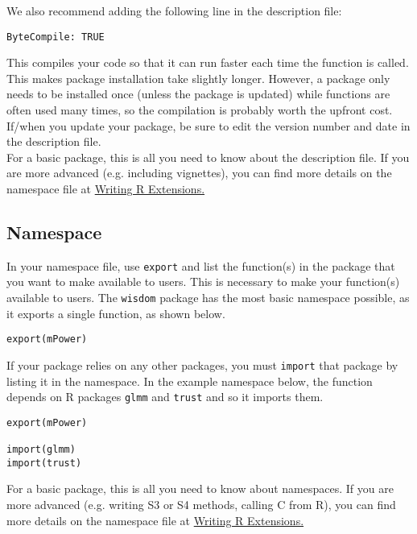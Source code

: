 \documentclass{article}
\begin{document}
We also recommend adding the following line in the description file:
\begin{verbatim}
ByteCompile: TRUE
\end{verbatim}
This compiles your code so that it can run faster each time the function is called. This makes package installation take slightly longer. However, a package only needs to be installed once (unless the package is updated) while functions are often used many times, so the compilation is probably worth the upfront cost.\\

If/when you update your package, be sure to edit the version number and date in the description file. \\ 

For a basic package, this is all you need to know about the description file. If you are more advanced (e.g. including vignettes), you can find more details on the namespace file at  \href{https://cran.r-project.org/doc/manuals/R-exts.html#The-DESCRIPTION-file}{Writing R Extensions.}


\subsection{Namespace} In your namespace file, use  \texttt{export} and list the function(s) in the package that you want to make available to users. This is necessary to make your function(s) available to users. The  \texttt{wisdom} package has the most basic namespace possible, as it exports a single function, as shown below.

\begin{verbatim}
export(mPower)
\end{verbatim}

If your package relies on any other packages, you must \texttt{import} that package by listing it in the namespace. In the example namespace below, the function depends on R packages \texttt{glmm} and \texttt{trust} and so it imports them.

\begin{verbatim}
export(mPower)

import(glmm)
import(trust)
\end{verbatim}

For a basic package, this is all you need to know about namespaces. If you are more advanced (e.g. writing S3 or S4 methods, calling C from R), you can find more details on the namespace file at  \href{https://cran.r-project.org/doc/manuals/R-exts.html#Package-namespaces}{Writing R Extensions.}
\end{document}
